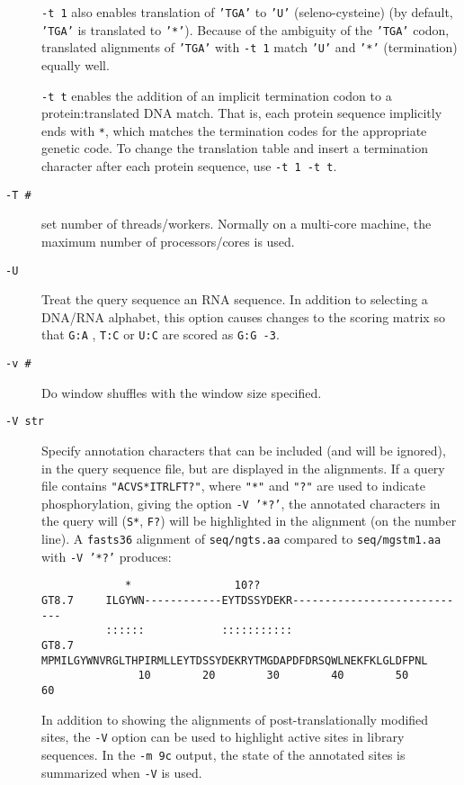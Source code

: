\documentclass[11pt]{article}
\begin{document}
\begin{description}
  \texttt{-t 1} also enables translation of \texttt{'TGA'} to
  \texttt{'U'} (seleno-cysteine) (by default, \texttt{'TGA'} is
  translated to \texttt{'*'}). Because of the ambiguity of the
  \texttt{'TGA'} codon, translated alignments of \texttt{'TGA'} with
  \texttt{-t 1} match \texttt{'U'} and \texttt{'*'} (termination)
  equally well.

\texttt{-t t} enables the addition of an implicit termination codon to
a protein:translated DNA match.  That is, each protein sequence
implicitly ends with \texttt{*}, which matches the termination codes
for the appropriate genetic code.  To change the translation table and
insert a termination character after each protein sequence, use
\texttt{-t 1 -t t}.

\item[\texttt{-T \#}]
set number of threads/workers.  Normally on a multi-core machine, the maximum
number of processors/cores is used.
\item[\texttt{-U}]
Treat the query sequence an RNA sequence.  In addition to selecting a
DNA/RNA alphabet, this option causes changes to the scoring matrix so
that \texttt{G:A} , \texttt{T:C} or \texttt{U:C} are scored as \mbox{\texttt{G:G -3}}.
\item[\texttt{-v \#}]
Do window shuffles with the window size specified.
\item[\texttt{-V str}] Specify annotation characters that can be
  included (and will be ignored), in the query sequence file, but are
  displayed in the alignments.  If a query file contains
  \texttt{"ACVS*ITRLFT?"}, where \texttt{"*"} and \texttt{"?"}  are
  used to indicate phosphorylation, giving the option \mbox{\texttt{-V
      '*?'}}, the annotated characters in the query will (\texttt{S*},
  \texttt{F?}) will be highlighted in the alignment (on the number
  line). A \texttt{fasts36} alignment of \texttt{seq/ngts.aa} compared
  to \texttt{seq/mgstm1.aa} with \texttt{-V '*?'} produces:
\begin{footnotesize}
\begin{verbatim}
             *                10??                                 
GT8.7     ILGYWN------------EYTDSSYDEKR----------------------------
          ::::::            :::::::::::                            
GT8.7  MPMILGYWNVRGLTHPIRMLLEYTDSSYDEKRYTMGDAPDFDRSQWLNEKFKLGLDFPNL
               10        20        30        40        50        60
\end{verbatim}
\end{footnotesize}
In addition to showing the alignments of post-translationally modified
sites, the \texttt{-V} option can be used to highlight active sites in
library sequences. In the \texttt{-m 9c} output, the state of the
annotated sites is summarized when \texttt{-V} is used.


\end{description}
\end{document}
